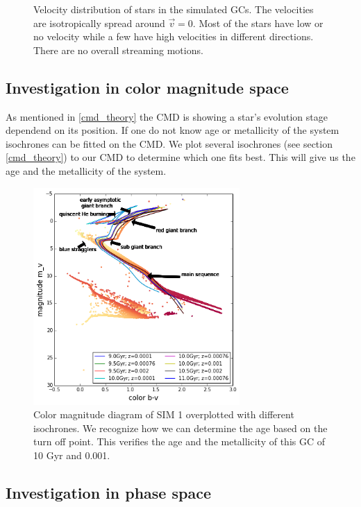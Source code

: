 \begin{figure}[htbp]
\caption{Velocity distribution of stars in the simulated \acp{GC}. The velocities are isotropically spread around \(\vec{v}=0\). Most of the stars have low or no velocity while a few have high velocities in different directions. There are no overall streaming motions.}
\label{fig:velocity_scatter}
\end{figure}


\subsection{Investigation in color magnitude space}
As mentioned in \ref{cmd_theory} the \ac{CMD} is showing a star's evolution stage dependend on its position. If one do not know age or metallicity of the system isochrones can be fitted on the \ac{CMD}. We plot several isochrones (see section \ref{cmd_theory}) to our \ac{CMD} to determine which one fits best. This will give us the age and the metallicity of the system. 
\begin{figure}[htbp]
\centering
\includegraphics[width=0.7\textwidth]{Plots/cmd_isochrones}
\caption{Color magnitude diagram of SIM 1 overplotted with different isochrones. We recognize how we can determine the age based on the turn off point. This verifies the age and the metallicity of this \ac{GC} of 10 Gyr and 0.001.}
	\label{fig:cmd_isochrones}
\end{figure}



\subsection{Investigation in phase space}

